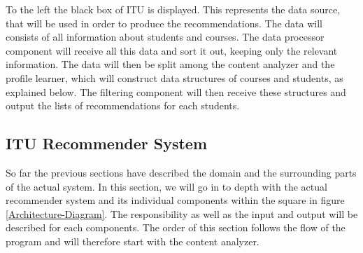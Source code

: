 To the left the black box of ITU is displayed. This represents the data source, that will be used in order to produce the recommendations. The data will consists of all information about students and courses. The data processor component will receive all this data and sort it out, keeping only the relevant information. The data will then be split among the content analyzer and the profile learner, which will construct data structures of courses and students, as explained below. The filtering component will then receive these structures and output the lists of recommendations for each students. 


\subsection{ITU Recommender System}
So far the previous sections have described the domain and the surrounding parts of the actual system. In this section, we will go in to depth with the actual recommender system and its individual components within the square in figure \ref{Architecture-Diagram}. The responsibility as well as the input and output will be described for each components. The order of this section follows the flow of the program and will therefore start with the content analyzer.
